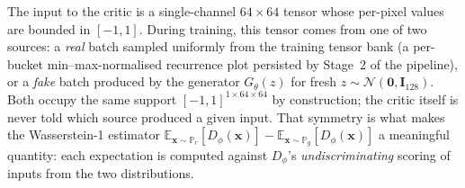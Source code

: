 
The input to the critic is a single-channel $64 \times 64$ tensor whose
per-pixel values are bounded in $[-1, 1]$. During training, this tensor
comes from one of two sources: a \emph{real} batch sampled uniformly
from the training tensor bank (a per-bucket min--max-normalised
recurrence plot persisted by Stage~2 of the pipeline), or a \emph{fake}
batch produced by the generator $G_\theta(z)$ for fresh
$z \sim \mathcal{N}(\mathbf{0}, \mathbf{I}_{128})$. Both occupy the same
support $[-1, 1]^{1 \times 64 \times 64}$ by construction; the critic
itself is never told which source produced a given input. That symmetry
is what makes the Wasserstein-1 estimator
$\mathbb{E}_{\mathbf{x} \sim \mathbb{P}_r}[D_\phi(\mathbf{x})] -
\mathbb{E}_{\mathbf{x} \sim \mathbb{P}_g}[D_\phi(\mathbf{x})]$ a
meaningful quantity: each expectation is computed against $D_\phi$'s
\emph{undiscriminating} scoring of inputs from the two distributions.
